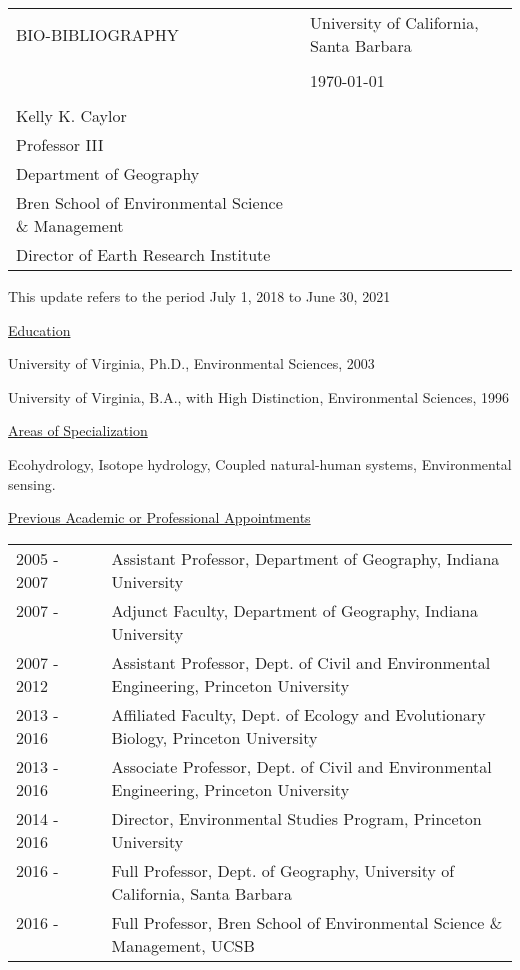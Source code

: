 \documentclass[10pt]{article}
\begin{document}
\noindent
\begin{tabularx}{\linewidth}{XX} 
BIO-BIBLIOGRAPHY & \hfill University of California, Santa Barbara \\ \\
 & \hfill \today \\ \\
 Kelly K. Caylor &   \\ 
 Professor III & \\
 Department of Geography & \\
 Bren School of Environmental Science \& Management & \\
 Director of Earth Research Institute & 
 \end{tabularx}

\vspace{1cm}

This update refers to the period July 1, 2018 to June 30, 2021


\vspace{1cm}

\raggedright

\vspace{0.5cm}
\underline{Education}

University of Virginia, Ph.D., Environmental Sciences, 2003

University of Virginia, B.A., with High Distinction, Environmental Sciences, 1996

\vspace{0.5cm}
\underline{Areas of Specialization}

Ecohydrology, Isotope hydrology, Coupled natural-human systems, Environmental sensing.

\vspace{0.5cm}
\underline{Previous Academic or Professional Appointments}
\begin{tabular}{l p{5.5in} }

2005 - 2007 \ \ \ \  & Assistant Professor, Department of Geography, Indiana University \\
2007 - \ \ \ \ & Adjunct Faculty, Department of Geography, Indiana University \\ 
2007 - 2012 \ \ \ \ & Assistant Professor, Dept. of Civil and Environmental Engineering, Princeton University \\
2013 - 2016 & Affiliated Faculty, Dept. of Ecology and Evolutionary Biology, Princeton University \\
2013 - 2016 & Associate Professor, Dept. of Civil and Environmental Engineering, Princeton University \\
2014 - 2016 & Director, Environmental Studies Program, Princeton University \\
2016 - \ \ \ \ & Full Professor, Dept. of Geography, University of California, Santa Barbara \\ 
2016 - \ \ \ \ & Full Professor, Bren School of Environmental Science \& Management, UCSB \\ 

\end{tabular}
\end{document}
